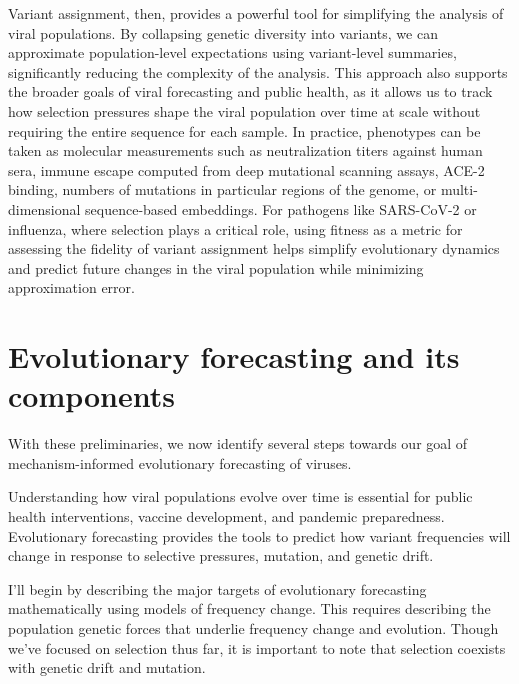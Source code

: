 Variant assignment, then, provides a powerful tool for simplifying the analysis of viral populations.
By collapsing genetic diversity into variants, we can approximate population-level expectations using variant-level summaries, significantly reducing the complexity of the analysis.
This approach also supports the broader goals of viral forecasting and public health, as it allows us to track how selection pressures shape the viral population over time at scale without requiring the entire sequence for each sample.
In practice, phenotypes can be taken as molecular measurements such as neutralization titers against human sera, immune escape computed from deep mutational scanning assays, ACE-2 binding, numbers of mutations in particular regions of the genome, or multi-dimensional sequence-based embeddings. \cite{Jian2023, Dadonaite2023, greaney2022antibody, Nanduri2024}
For pathogens like SARS-CoV-2 or influenza, where selection plays a critical role, using fitness as a metric for assessing the fidelity of variant assignment helps simplify evolutionary dynamics and predict future changes in the viral population while minimizing approximation error.

\section{Evolutionary forecasting and its components}%

With these preliminaries, we now identify several steps towards our goal of mechanism-informed evolutionary forecasting of viruses.

Understanding how viral populations evolve over time is essential for public health interventions, vaccine development, and pandemic preparedness. 
Evolutionary forecasting provides the tools to predict how variant frequencies will change in response to selective pressures, mutation, and genetic drift.

I'll begin by describing the major targets of evolutionary forecasting mathematically using models of frequency change.
This requires describing the population genetic forces that underlie frequency change and evolution.
Though we've focused on selection thus far, it is important to note that selection coexists with genetic drift and mutation.

